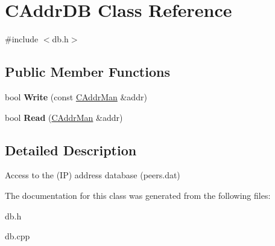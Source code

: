 \hypertarget{class_c_addr_d_b}{}\section{C\+Addr\+DB Class Reference}
\label{class_c_addr_d_b}


{\ttfamily \#include $<$db.\+h$>$}

\subsection*{Public Member Functions}
\begin{DoxyCompactItemize}
\item 
\mbox{\label{class_c_addr_d_b_aaec90dba59cd69a2f25bc5630a1dde39}} 
bool {\bfseries Write} (const \mbox{\hyperlink{class_c_addr_man}{C\+Addr\+Man}} \&addr)
\item 
\mbox{\label{class_c_addr_d_b_aed4b567fb7c2dd15b2856e7c769967b7}} 
bool {\bfseries Read} (\mbox{\hyperlink{class_c_addr_man}{C\+Addr\+Man}} \&addr)
\end{DoxyCompactItemize}


\subsection{Detailed Description}
Access to the (IP) address database (peers.\+dat) 

The documentation for this class was generated from the following files\+:\begin{DoxyCompactItemize}
\item 
db.\+h\item 
db.\+cpp\end{DoxyCompactItemize}
